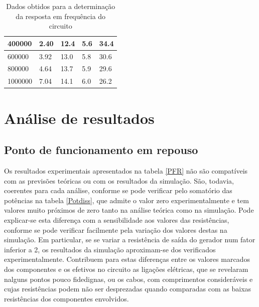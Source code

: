 \documentclass[%
  reprint,
  nofootinbib,
  amsmath,amssymb,
  aps,
  10pt,
  a4paper
]{revtex4-1}
\begin{document}
\begin{table}[h]
\begin{tabular}{|l|l|l|l|l|}
    400000                           & 2.40  & 12.4&  5.6&34.4				\\ \hline
    600000                           & 3.92  & 13.0&  5.8&30.6				\\ \hline
    800000                           & 4.64  & 13.7&  5.9&29.6				\\ \hline
    1000000                          & 7.04  & 14.1&  6.0&26.2				\\ \hline
    \end{tabular}
\caption{Dados obtidos para a determinação da resposta em frequência do circuito}
\label{tab:respostafrequenciaresultados}
\end{table}








\section{Análise de resultados}
\label{s:aresul}
\subsection{Ponto de funcionamento em repouso}
Os resultados experimentais apresentados na tabela \ref{PFR} não são compatíveis com as previsões teóricas ou com os resultados da simulação. São, todavia, coerentes para cada análise, conforme se pode verificar pelo somatório das potências na tabela \ref{Potdiss}, que admite o valor zero experimentalmente e tem valores muito próximos de zero tanto na análise teórica como na simulação. Pode explicar-se esta diferença com a sensibilidade aos valores das resistências, conforme se pode verificar facilmente pela variação dos valores destas na simulação. Em particular, se se variar a resistência de saída do gerador num fator inferior a 2, os resultados da simulação aproximam-se dos verificados experimentalmente. Contribuem para estas diferenças entre os valores marcados dos componentes e os efetivos no circuito as ligações elétricas, que se revelaram nalguns pontos pouco fidedignas, ou os cabos, com comprimentos consideráveis e cujas resistências podem não ser desprezadas quando comparadas com as baixas resistências dos componentes envolvidos.
\end{document}
